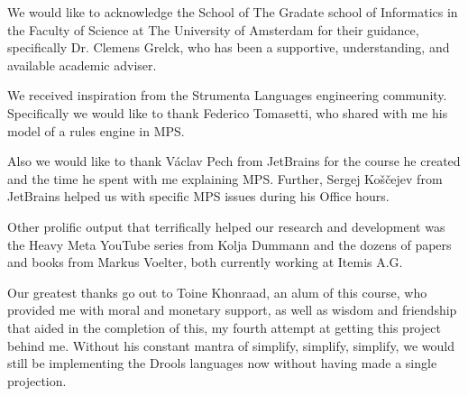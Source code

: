\begin{acknowledgements}
    \addchaptertocentry{\acknowledgementname}
    We would like to acknowledge the School of The Gradate school of Informatics in the Faculty of Science at The University of Amsterdam for their guidance, specifically Dr. Clemens Grelck, who has been a supportive, understanding, and available academic adviser.
    

    We received inspiration from the Strumenta Languages engineering community.
    Specifically we would like to thank Federico Tomasetti, who shared with me his model of a rules engine in MPS.


    Also we would like to thank Václav Pech from JetBrains for the course he created and the time he spent with me explaining MPS.
    Further, Sergej Koščejev from JetBrains helped us with specific MPS issues during his Office hours.


    Other prolific output that terrifically helped our research and development was the Heavy Meta YouTube series from Kolja Dummann and the dozens of papers and books from Markus Voelter, both currently working at Itemis A.G.

    
    Our greatest thanks go out to Toine Khonraad, an alum of this course, who provided me with moral and monetary support, as well as wisdom and friendship that aided in the completion of this, my fourth attempt at getting this project behind me.
    Without his constant mantra of simplify, simplify, simplify, we would still be implementing the Drools languages now without having made a single projection.
    
\end{acknowledgements}